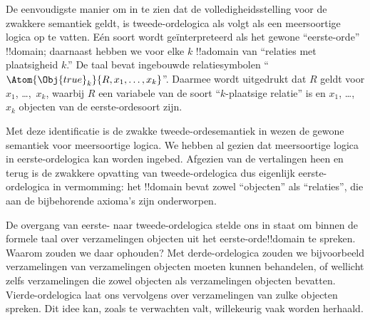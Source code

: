 \documentclass[openany]{memoir}
\begin{document}
De eenvoudigste manier om in te zien dat de volledigheidsstelling voor de
zwakkere semantiek geldt, is tweede-ordelogica als volgt als een meersoortige
logica op te vatten. Eén soort wordt geïnterpreteerd als het gewone
``eerste-orde'' !!{domain}; daarnaast hebben we voor elke $k$ !!a{domain} van
``relaties met plaatsigheid $k$.'' De taal bevat ingebouwde relatiesymbolen
``$\Atom{\Obj{true}_k}{R,x_1,\dots,x_k}$''. Daarmee wordt uitgedrukt dat $R$
geldt voor $x_1$, \dots,~$x_k$, waarbij $R$ een variabele van de soort
``$k$-plaatsige relatie'' is en $x_1$, \dots,~$x_k$ objecten van de
eerste-ordesoort zijn.

Met deze identificatie is de zwakke tweede-ordesemantiek in wezen de gewone
semantiek voor meersoortige logica. We hebben al gezien dat meersoortige
logica in eerste-ordelogica kan worden ingebed. Afgezien van de vertalingen
heen en terug is de zwakkere opvatting van tweede-ordelogica dus eigenlijk
eerste-ordelogica in vermomming: het !!{domain} bevat zowel ``objecten'' als
``relaties'', die aan de bijbehorende axioma's zijn onderworpen.
\endgroup

\begingroup
\def\olfilename{OLP-0178}
\def\olfilepath{content/first-order-logic/beyond/}
\hypertarget{unit-OLP-0178}{}





De overgang van eerste- naar tweede-ordelogica stelde ons in staat om binnen
de formele taal over verzamelingen objecten uit het eerste-orde!!{domain} te
spreken. Waarom zouden we daar ophouden? Met derde-ordelogica zouden we
bijvoorbeeld verzamelingen van verzamelingen objecten moeten kunnen
behandelen, of wellicht zelfs verzamelingen die zowel objecten als
verzamelingen objecten bevatten. Vierde-ordelogica laat ons vervolgens over
verzamelingen van zulke objecten spreken. Dit idee kan, zoals te verwachten
valt, willekeurig vaak worden herhaald.
\end{document}

